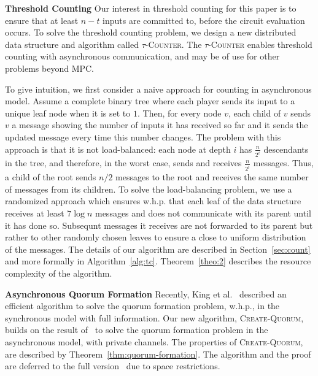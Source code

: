 \documentclass[10pt]{llncs}
\newcommand{\whp}{w.h.p.\xspace}
\newcommand{\tc}{\textsc{$\tau$-Counter}\xspace}
\newcommand{\cq}{\textsc{Create-Quorum}\xspace}
\begin{document}
\smallskip
\noindent
{\bf Threshold Counting}
Our interest in threshold counting for this paper is to ensure that at
least $n-t$ inputs are committed to, before the circuit evaluation occurs. 
To solve the threshold counting problem, we design a new distributed data 
structure and algorithm
called \tc. The \tc enables threshold counting with 
asynchronous communication, and may be of use for other problems beyond MPC. 

To give intuition, we first consider a naive approach
for counting in asynchronous model. Assume a complete binary tree where 
each player sends its input to a unique leaf node when it is set to $1$. 
Then, for every node $v$, each child of $v$ sends $v$ a message showing 
the number of inputs it has received so far and it sends the updated 
message every time this number changes. The
problem with this approach is that it is not load-balanced: each node
at depth $i$ has $\frac{n}{2^i}$ descendants in the tree, and
therefore, in the worst case, sends and receives $\frac{n}{2^i}$
messages. Thus, a child of the root sends $n/2$ messages to the root
and receives the same number of messages from its children. To solve
the load-balancing problem, we use a randomized approach which ensures 
\whp that each leaf of the data structure receives at least $7\log n$ 
messages and does not communicate with its parent until it has done so.
Subsequnt messages it receives are not forwarded to its parent but rather 
to other randomly chosen leaves to ensure a close to uniform distribution 
of the messages. The details of our algorithm are described in 
Section~\ref{sec:count} and more formally in
Algorithm~\ref{alg:tc}. Theorem~\ref{theo:2} describes the resource complexity 
of the algorithm.



\smallskip
\noindent
{\bf Asynchronous Quorum Formation} 
 Recently, King et al.~\cite{ICDCN11} described an efficient algorithm
 to solve the quorum formation problem, \whp, in the synchronous model
 with full information. Our new algorithm, \cq, builds on the result
 of~\cite{ICDCN11} to solve the quorum formation problem in the
 asynchronous model, with private channels. The properties of \cq, are
 described by Theorem~\ref{thm:quorum-formation}. The algorithm and
 the proof  are deferred to the full version~\cite{dkms2013} due to space 
restrictions.
\end{document}
